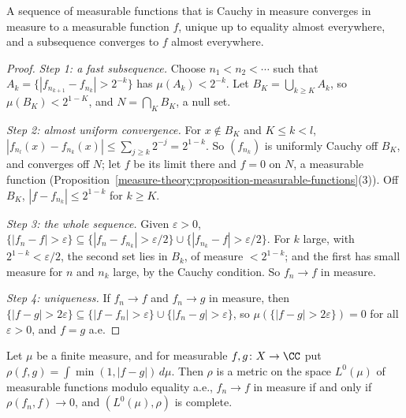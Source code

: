 \begin{theorem}[Riesz]\label{measure-theory:theorem-cauchy-in-measure}
A sequence of measurable functions that is Cauchy in measure converges in measure to a measurable function $f$, unique up to equality almost everywhere, and a subsequence converges to $f$
almost everywhere.
\end{theorem}

\begin{proof}
\emph{Step 1: a fast subsequence.} Choose $n_1 < n_2 < \cdots$ such that $A_k = \{|f_{n_{k+1}} - f_{n_k}| > 2^{-k}\}$ has $\mu(A_k) < 2^{-k}$. Let $B_K = \bigcup_{k \geq K}A_k$, so
$\mu(B_K) < 2^{1-K}$, and $N = \bigcap_KB_K$, a null set.

\emph{Step 2: almost uniform convergence.} For $x \notin B_K$ and $K \leq k < l$, $|f_{n_l}(x) - f_{n_k}(x)| \leq \sum_{j \geq k}2^{-j} = 2^{1-k}$. So $(f_{n_k})$ is uniformly Cauchy off $B_K$, and
converges off $N$; let $f$ be its limit there and $f = 0$ on $N$, a measurable function (Proposition~\ref{measure-theory:proposition-measurable-functions}(3)). Off $B_K$, $|f - f_{n_k}| \leq 2^{1-k}$
for $k \geq K$.

\emph{Step 3: the whole sequence.} Given $\varepsilon > 0$, $\{|f_n - f| > \varepsilon\} \subseteq \{|f_n - f_{n_k}| > \varepsilon/2\} \cup \{|f_{n_k} - f| > \varepsilon/2\}$. For $k$ large, with
$2^{1-k} < \varepsilon/2$, the second set lies in $B_k$, of measure $< 2^{1-k}$; and the first has small measure for $n$ and $n_k$ large, by the Cauchy condition. So $f_n \to f$ in measure.

\emph{Step 4: uniqueness.} If $f_n \to f$ and $f_n \to g$ in measure, then $\{|f - g| > 2\varepsilon\} \subseteq \{|f - f_n| > \varepsilon\} \cup \{|f_n - g| > \varepsilon\}$, so
$\mu(\{|f - g| > 2\varepsilon\}) = 0$ for all $\varepsilon > 0$, and $f = g$ a.e.
\end{proof}

\begin{proposition}\label{measure-theory:proposition-measure-metric}
Let $\mu$ be a finite measure, and for measurable $f, g \colon X \to \CC$ put $\rho(f, g) = \int\min(1, |f - g|)\,d\mu$. Then $\rho$ is a metric on the space $L^0(\mu)$ of measurable functions modulo
equality a.e., $f_n \to f$ in measure if and only if $\rho(f_n, f) \to 0$, and $(L^0(\mu), \rho)$ is complete.
\end{proposition}

